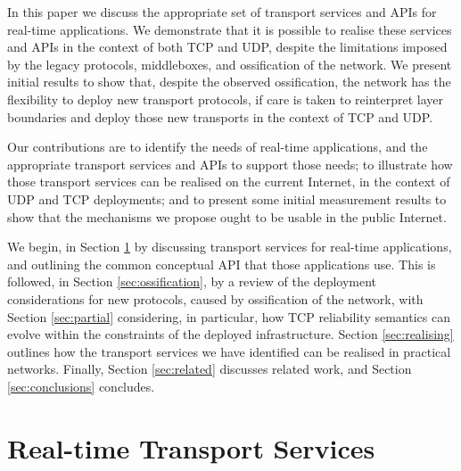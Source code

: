 \documentclass{sig-alternate-05-2015}
\begin{document}
In this paper we discuss the appropriate set of transport services and APIs
for real-time applications.
We demonstrate that it is possible to realise these services and APIs
in the context of both TCP and UDP, despite the limitations imposed by the
legacy protocols, middleboxes, and ossification of the network. 
We present initial results to show that, despite the observed ossification,
the network has the flexibility to deploy new transport protocols, if care
is taken to reinterpret layer boundaries and deploy those new transports in
the context of TCP and UDP.


Our contributions are to identify the needs of real-time applications, and
the appropriate transport services and APIs to support those needs; 
to illustrate how those transport services can be realised on the current
Internet, in the context of UDP and TCP deployments; and 
to present some initial measurement results to show that the mechanisms we
propose ought to be usable in the public Internet. 


We begin, in Section \ref{sec:services} by discussing transport services 
for real-time applications, and outlining the common conceptual API that
those applications use. 
This is followed, in Section \ref{sec:ossification}, by a review of the
deployment considerations for new protocols, caused by ossification of
the network, with Section \ref{sec:partial} considering, in particular, how
TCP reliability semantics can evolve within the constraints of the deployed
infrastructure.
Section \ref{sec:realising} outlines how the transport services we have
identified can be realised in practical networks.
Finally, Section \ref{sec:related} discusses related work, and Section
\ref{sec:conclusions} concludes.

\section{Real-time Transport Services}
\label{sec:services}
\end{document}
